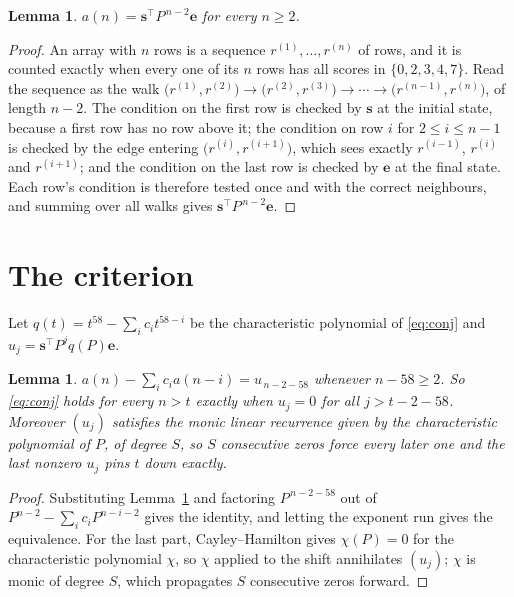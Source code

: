 \documentclass[11pt,a4paper]{article}
\theoremstyle{plain}
\newtheorem{lemma}[theorem]{Lemma}
\theoremstyle{definition}
\begin{document}
\begin{lemma}\label{lem:walk}
$a(n)=\mathbf{s}^{\!\top}P^{\,n-2}\mathbf{e}$ for every $n\ge2$.
\end{lemma}

\begin{proof}
An array with $n$ rows is a sequence $r^{(1)},\dots,r^{(n)}$ of rows, and it is counted
exactly when every one of its $n$ rows has all scores in $\{0,2,3,4,7\}$. Read the sequence as the
walk $\bigl(r^{(1)},r^{(2)}\bigr)\to\bigl(r^{(2)},r^{(3)}\bigr)\to\cdots\to
\bigl(r^{(n-1)},r^{(n)}\bigr)$, of length $n-2$. The condition on the first row is
checked by $\mathbf{s}$ at the initial state, because a first row has no row above it; the
condition on row $i$ for $2\le i\le n-1$ is checked by the edge entering
$\bigl(r^{(i)},r^{(i+1)}\bigr)$, which sees exactly $r^{(i-1)}$, $r^{(i)}$ and
$r^{(i+1)}$; and the condition on the last row is checked by $\mathbf{e}$ at the final
state. Each row's condition is therefore tested once and with the correct neighbours, and
summing over all walks gives $\mathbf{s}^{\!\top}P^{\,n-2}\mathbf{e}$.
\end{proof}

\section{The criterion}

Let $q(t)=t^{58}-\sum_i c_i t^{58-i}$ be the characteristic polynomial of
\eqref{eq:conj} and $u_j=\mathbf{s}^{\!\top}P^{j}q(P)\mathbf{e}$.

\begin{lemma}\label{lem:crit}
$a(n)-\sum_i c_i a(n-i)=u_{\,n-2-58}$ whenever $n-58\ge2$. So \eqref{eq:conj}
holds for every $n>t$ exactly when $u_j=0$ for all $j>t-2-58$. Moreover $(u_j)$
satisfies the monic linear recurrence given by the characteristic polynomial of $P$, of
degree $S$, so $S$ consecutive zeros force every later one and the last nonzero $u_j$ pins
$t$ down exactly.
\end{lemma}

\begin{proof}
Substituting Lemma~\ref{lem:walk} and factoring $P^{\,n-2-58}$ out of
$P^{n-2}-\sum_i c_i P^{n-i-2}$ gives the identity, and letting the exponent run gives the
equivalence. For the last part, Cayley--Hamilton gives $\chi(P)=0$ for the characteristic
polynomial $\chi$, so $\chi$ applied to the shift annihilates $(u_j)$; $\chi$ is monic of
degree $S$, which propagates $S$ consecutive zeros forward.
\end{proof}
\end{document}
